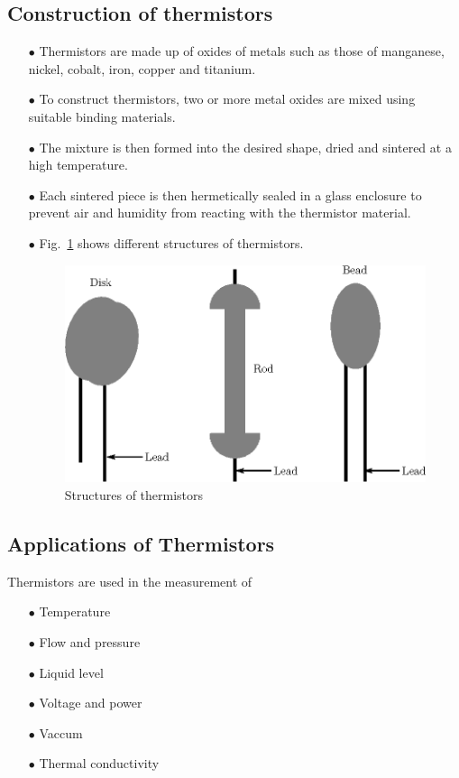 \subsection{Construction of thermistors}\label{sec8.9.1}
\begin{itemize}
\item[$\bullet$] Thermistors are made up of oxides of metals such as those of manganese, nickel, cobalt, iron, copper and titanium.

\item[$\bullet$] To construct thermistors, two or more metal oxides are mixed using suitable binding materials.

\item[$\bullet$] The mixture is then formed into the desired shape, dried and sintered at a high temperature.

\item[$\bullet$] Each sintered piece is then hermetically sealed in a glass enclosure to prevent air and humidity from reacting with the thermistor material.

\item[$\bullet$] Fig.~\ref{fig8.11} shows different structures of thermistors.
\begin{figure}[H]
\centering
\includegraphics{chap8/fig8.11.eps}
\caption{Structures of thermistors}\label{fig8.11}
\end{figure}
\end{itemize}

\subsection{Applications of Thermistors}\label{sec8.9.2}

Thermistors are used in the measurement of
\begin{itemize}
\item[$\bullet$] Temperature

\item[$\bullet$] Flow and pressure

\item[$\bullet$] Liquid level

\item[$\bullet$] Voltage and power

\item[$\bullet$] Vaccum

\item[$\bullet$] Thermal conductivity
\end{itemize}

